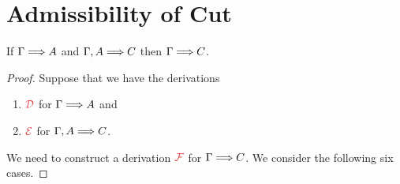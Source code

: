 


\maketitle

\section{Admissibility of Cut}

\begin{theorem}[Cut]
  If $\sequent{A}$ and $\sequent[A]{C}$ then $\sequent{C}$.
\end{theorem}
\begin{proof}
  Suppose that we have the derivations
  \begin{enumerate}
    \item $\prfName{D}$ for $\sequent{A}$ and
    \item $\prfName{E}$ for $\sequent[A]{C}$.
  \end{enumerate}
  We need to construct a derivation $\prfName{F}$ for $\sequent{}{C}$.
  We consider the following six cases.

  \vspace{1em}
\end{proof}

